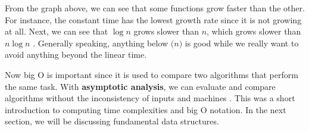 \documentclass[../../main.tex]{subfiles}
\begin{document}
From the graph above, we can see that some functions grow faster
than the other. For instance, the constant time has the lowest
growth rate since it is not growing at all. Next, we can see
that $\log{n}$ grows slower than $n$, which grows slower than
$n \log{n}$ \cite{CS02-5}. Generally speaking, anything below
$\mathcal(n)$ is good while we really want to avoid anything
beyond the linear time.

Now big O is important since it is used to compare two algorithms
that perform the same task. With \textbf{asymptotic analysis},
we can evaluate and compare algorithms without the inconsistency
of inputs and machines \cite{CS02-5}. This was a short introduction
to computing time complexities and big O notation. In the next
section, we will be discussing fundamental data structures.
\end{document}

